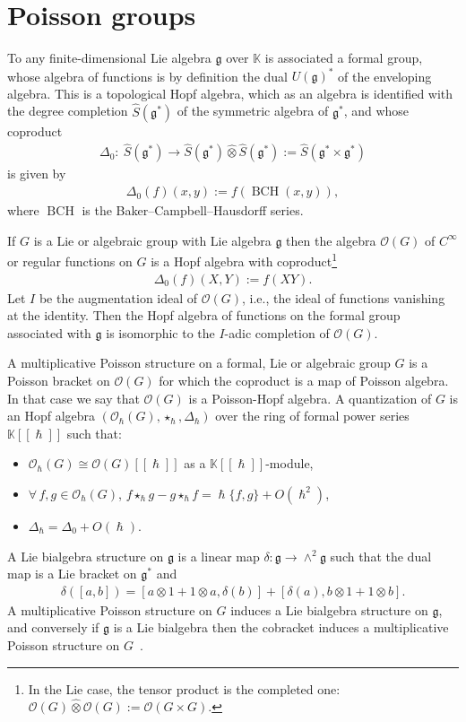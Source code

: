 \documentclass[pdftex]{sigma}
\numberwithin{equation}{section}
\newcommand{\mf}[1]{\mathfrak{#1}}
\newcommand{\h}{\hslash}
\newcommand{\ot}{\otimes}
\newcommand{\cO}{\mathcal O}
\newcommand{\kk}{\mathbb K}
\theoremstyle{definition}
\begin{document}
\section{Poisson groups}
To any f\/inite-dimensional Lie algebra $\mf g$ over $\kk$ is associated a formal group, whose algebra of functions is by def\/inition the dual $U(\mf g)^*$ of the enveloping algebra. This is a topological Hopf algebra, which as an algebra is identif\/ied with the degree completion $\widehat{S}(\mf g^*)$ of the symmetric algebra of $\mf g^*$, and whose coproduct
\begin{gather*}
\Delta_0\colon \ \widehat{S}(\mf g^*)\longrightarrow \widehat{S}(\mf g^*)\hat\ot \widehat{S}(\mf g^*):=\widehat{S}(\mf g^*\times \mf g^*)
\end{gather*}
is given by
\begin{gather*}
	\Delta_0(f)(x,y):=f(\operatorname{BCH}(x,y)),
\end{gather*}
where $\operatorname{BCH}$ is the Baker--Campbell--Hausdorf\/f series.

If $G$ is a Lie or algebraic group with Lie algebra $\mf g$ then the algebra $\cO(G)$ of $C^\infty$ or regular functions on $G$ is a Hopf algebra with coproduct\footnote{In the Lie case, the tensor product is the completed one: $\cO(G)\hat\ot \cO(G):=\cO(G\times G)$.}
\begin{gather*}
	\Delta_0(f)(X,Y):=f(XY).
\end{gather*}
Let $I$ be the augmentation ideal of $\cO(G)$, i.e., the ideal of functions vanishing at the identity. Then the Hopf algebra of functions on the formal group associated with $\mf g$ is isomorphic to the $I$-adic completion of $\cO(G)$.

A multiplicative Poisson structure on a formal, Lie or algebraic group $G$ is a Poisson bracket on $\cO(G)$ for which the coproduct is a map of Poisson algebra. In that case we say that $\cO(G)$ is a Poisson-Hopf algebra.
A quantization of $G$ is an Hopf algebra $(\cO_\h(G),\star_\h,\Delta_\h)$ over the ring of formal power series $\kk[[\h]]$ such that:
\begin{itemize}\itemsep=0pt
	\item $\cO_\h(G)\cong \cO(G)[[\h]]$ as a $\kk[[\h]]$-module,
	\item $\forall\, f, g \in \cO_\h(G)$, $f\star_\h g - g\star_\h f=\h\{f,g\}+O(\h^2)$,
	\item $\Delta_\h=\Delta_0+O(\h)$.
\end{itemize}

A Lie bialgebra structure on $\mf g$ is a linear map $\delta\colon \mf g\rightarrow \wedge^2 \mf g$ such that the dual map is a Lie bracket on $\mf g^*$ and
\begin{gather*}
	\delta([a,b])=[a\ot 1+1\ot a,\delta(b)]+[\delta(a),b\ot 1+1\ot b].
\end{gather*}
A multiplicative Poisson structure on $G$ induces a Lie bialgebra structure on $\mf g$, and conversely if $\mf g$ is a Lie bialgebra then the cobracket induces a multiplicative Poisson structure on $G$~\cite{Drinfeld1987}.
\end{document}
